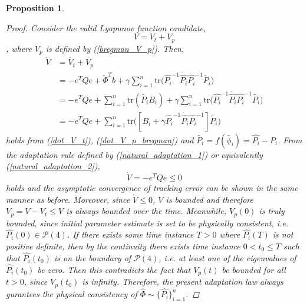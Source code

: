 \documentclass[Afour,sageh,times]{sagej}
\newtheorem{proposition}{Proposition}
\begin{document}
\begin{proposition}
\begin{proof}
Consider the valid Lyapunov function candidate,
\begin{equation*}
V = V_t + V_p
\end{equation*}
, where $V_p$ is defined by (\ref{bregman_V_p}). Then,
\begin{align*}
\dot{V} &= \dot{V_t} + \dot{V_p}\\
 &= -e^{T}Qe + \tilde{\Phi}^{T}b + \gamma\sum_{i=1}^n \mathrm{tr}\big(\hat{P_i}^{-1}\dot{\hat{P_i}}\hat{P_i}^{-1}\tilde{P_i}\big)\\
 &=-e^{T}Qe + \sum_{i=1}^n\mathrm{tr}(\tilde{P_i}B_i) + \gamma\sum_{i=1}^n \mathrm{tr}\big(\hat{P_i}^{-1}\dot{\hat{P_i}}\hat{P_i}^{-1}\tilde{P_i}\big)\\
 &= -e^{T}Qe + \sum_{i=1}^n \mathrm{tr}\big([B_i +\gamma\hat{P_i}^{-1}\dot{\hat{P_i}}\hat{P_i}^{-1}]\tilde{P_i}\big)
\end{align*}
holds from (\ref{dot_V_t}), (\ref{dot_V_p_bregman}) and $\tilde{P_i} = f(\tilde{\phi_i}) = \hat{P_i}-P_i$. From the adaptation rule defined by (\ref{natural_adaptation_1}) or equivalently (\ref{natural_adaptation_2}),
\begin{equation*}
\dot{V} = -e^{T}Qe \leq 0
\end{equation*}
holds and the asymptotic convergence of tracking error can be shown in the same manner as before. Moreover, since $\dot{V} \leq 0$, $V$ is bounded and therefore $V_p = V - V_t \leq V$ is always bounded over the time. Meanwhile, $V_p(0)$ is truly bounded, since initial parameter estimate is set to be physically consistent, i.e. $\hat{P_i}(0) \in \mathcal{P}(4)$. If there exists some time instance $T>0$ where $\hat{P_i}(T)$ is not positive definite, then by the continuity there exists time instance $0<t_0\leq T$ such that $\hat{P_i}(t_0)$ is on the boundary of $\mathcal{P}(4)$, i.e. at least one of the eigenvalues of $\hat{P_i}(t_0)$ be zero. Then this contradicts the fact that $V_p(t)$ be bounded for all $t>0$, since $V_p(t_0)$ is infinity. Therefore, the present adaptation law always gurantees the physical consistency of $\hat{\Phi} \sim \{\hat{P_i}\}_{i=1}^n$.
\end{proof}
\end{proposition}
\end{document}
